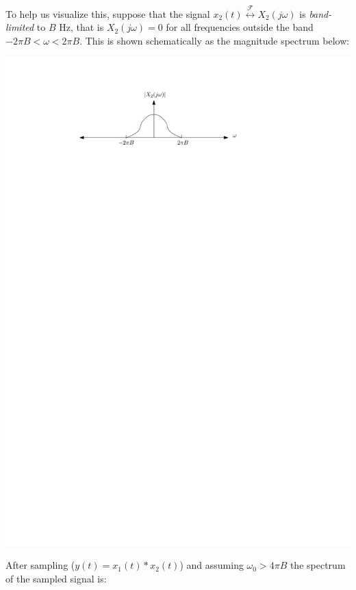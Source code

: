 To help us visualize this, suppose that the signal $x_2(t)  \stackrel{\mathcal{F}}{\longleftrightarrow} X_2(j\omega)$ is \emph{band-limited} to $B$ Hz, that is $X_2(j\omega) = 0$ for all frequencies outside the band $-2\pi B < \omega < 2\pi B$. This is shown schematically as the magnitude spectrum below:

\begin{center}
  \includegraphics[scale=1]{graphics/bandlimited.pdf}
\end{center}
After sampling ($y(t) = x_1(t)*x_2(t)$) and assuming $\omega_0 > 4\pi B$ the spectrum of the sampled signal is:

